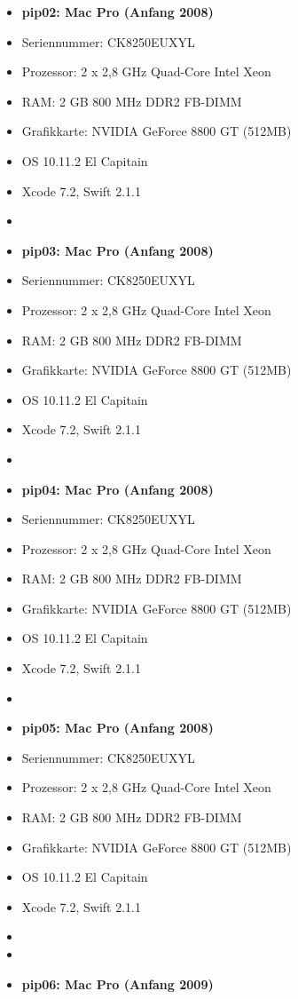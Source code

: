 \begin{itemize}
	\item\textbf{pip02: Mac Pro (Anfang 2008)}
	\item[]Seriennummer: CK8250EUXYL
	\item[]Prozessor: 	2 x 2,8 GHz Quad-Core Intel Xeon 
	\item[]RAM: 2 GB 800 MHz DDR2 FB-DIMM
	\item[]Grafikkarte: 	NVIDIA GeForce 8800 GT (512MB)
	\item[]OS 10.11.2 El Capitain
	\item[]Xcode 7.2, Swift 2.1.1
	\item[] 
	\item\textbf{pip03: Mac Pro (Anfang 2008)}
	\item[]Seriennummer: CK8250EUXYL
	\item[]Prozessor: 	2 x 2,8 GHz Quad-Core Intel Xeon 
	\item[]RAM: 2 GB 800 MHz DDR2 FB-DIMM
	\item[]Grafikkarte: NVIDIA GeForce 8800 GT (512MB)
	\item[]OS 10.11.2 El Capitain
	\item[]Xcode 7.2, Swift 2.1.1
	\item[] 
	\item\textbf{pip04: Mac Pro (Anfang 2008) }
	\item[]Seriennummer: CK8250EUXYL
	\item[]Prozessor: 2 x 2,8 GHz Quad-Core Intel Xeon 
	\item[]RAM: 2 GB 800 MHz DDR2 FB-DIMM
	\item[]Grafikkarte: 	NVIDIA GeForce 8800 GT  (512MB)
	\item[]OS 10.11.2 El Capitain
	\item[]Xcode 7.2, Swift 2.1.1
	\item[]
	\item\textbf{pip05: Mac Pro (Anfang 2008)}
	\item[]Seriennummer: CK8250EUXYL
	\item[]Prozessor: 2 x 2,8 GHz Quad-Core Intel Xeon 
	\item[]RAM: 2 GB 800 MHz DDR2 FB-DIMM
	\item[]Grafikkarte: 	NVIDIA GeForce 8800 GT  (512MB)
	\item[] OS 10.11.2 El Capitain
	\item[] Xcode 7.2, Swift 2.1.1
	\item[]
	\item[] 
	\item\textbf{pip06: Mac Pro (Anfang 2009)}

\end{itemize}
